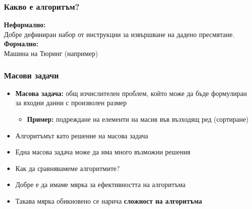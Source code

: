 \documentclass[alsotrans]{beamerswitch}
\begin{document}
\begin{frame}
  \frametitle{Какво е алгоритъм?}

  \pause
  \textbf{Неформално:}\\
  Добре дефиниран набор от инструкции за извършване на дадено пресмятане.\\[2em]
  \pause
  \textbf{Формално:}\\
  Машина на Тюринг (например)
\end{frame}

\begin{frame}
  \frametitle{Масови задачи}

  \begin{itemize}[<+->]
  \item \textbf{Масова задача:} общ изчислителен проблем, който може да бъде формулиран за входни данни с произволен размер
    \begin{itemize}
    \item \textbf{Пример:} подреждане на елементи на масив във възходящ ред (сортиране)
    \end{itemize}
  \item Алгоритъмът като решение на масова задача
  \item Една масова задача може да има много възможни решения
  \item \alert{Как да сравнявамеме алгоритмите?}
  \item Добре е да имаме мярка за ефективността на алгоритъма
  \item Такава мярка обикновено се нарича \textbf{сложност на алгоритъма}
  \end{itemize}
\end{frame}
\end{document}
